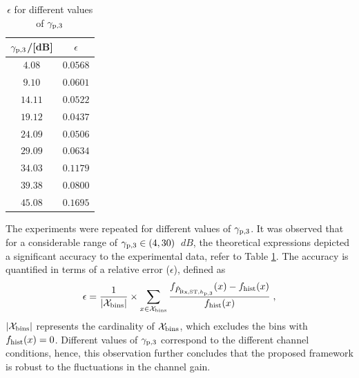 \begin{table}
        \renewcommand{\arraystretch}{1.4}
	\centering
	\caption{$\epsilon$ for different values of ${\gamma}_{\text{p,3}}$}
	\label{nichtzentral}
	\begin{tabular}{c||c} 
		\bfseries ${\gamma}_{\text{p,3}}$/[dB] &  \bfseries $\epsilon$ \\ \hline \hline
		$4.08$ &  $0.0568$ \\
		$9.10$ &  $0.0601$ \\
		$14.11$ & $0.0522$ \\
		$19.12$ & $0.0437$ \\
		$24.09$ & $0.0506$ \\
		$29.09$ & $0.0634$ \\
		$34.03$ & $0.1179$ \\
		$39.38$ & $0.0800$ \\
		$45.08$ & $0.1695$ \\ \hline
	\end{tabular}
\end{table}


The experiments were repeated for different values of ${\gamma}_{\text{p,3}}$. It was observed that for a considerable range of ${\gamma}_{\text{p,3}} \in (4,30)$ $\SI{}{dB}$, the theoretical expressions depicted a significant accuracy to the experimental data, refer to Table \ref{nichtzentral}. The accuracy is quantified in terms of a relative error ($\epsilon$), defined as
\begin{equation}
\label{fr}
\epsilon = \frac{1}{|\mathcal X_{\text{bins}}|} \times \sum_{x \in \mathcal X_{\text{bins}}} \frac{f_{\hat{P}_{\text{Rx,ST,$h_{\text{p,3}}$}}}(x) - f_{\text{hist}}(x)}{f_{\text{hist}}(x)} \;  , 
\end{equation}
$|\mathcal X_{\text{bins}}|$ represents the cardinality of $\mathcal X_{\text{bins}}$, which excludes the bins with $f_{\text{hist}}(x) = 0$. Different values of ${\gamma}_{\text{p,3}}$ correspond to the different channel conditions, hence, this observation further concludes that the proposed framework is robust to the fluctuations in the channel gain. 


